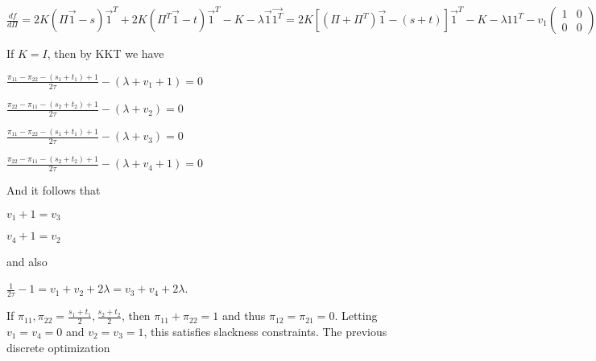 $\frac{df}{d\Pi}=2K(\Pi\vec{1}-s)\vec{1}^{T}+2K(\Pi^{T}\vec{1}-t)\vec{1}^{T}-K-\lambda\vec{1}\vec{1^{T}}=2K[(\Pi+\Pi^{T})\vec{1}-(s+t)]\vec{1}^{T}-K-\lambda11^{T}-v_{1}\left(\begin{array}{cc}
1 & 0\\
0 & 0
\end{array}\right)-v_{2}\left(\begin{array}{cc}
0 & 0\\
1 & 0
\end{array}\right)-v_{3}\left(\begin{array}{cc}
0 & 1\\
0 & 0
\end{array}\right)-v_{4}\left(\begin{array}{cc}
0 & 0\\
0 & 1
\end{array}\right)$

If $K=I$, then by KKT we have 

$\frac{\pi_{11}-\pi_{22}-(s_{1}+t_{1})+1}{2\tau}-(\lambda+v_{1}+1)=0$

$\frac{\pi_{22}-\pi_{11}-(s_{2}+t_{2})+1}{2\tau}-(\lambda+v_{2})=0$

$\frac{\pi_{11}-\pi_{22}-(s_{1}+t_{1})+1}{2\tau}-(\lambda+v_{3})=0$

$\frac{\pi_{22}-\pi_{11}-(s_{2}+t_{2})+1}{2\tau}-(\lambda+v_{4}+1)=0$

And it follows that

$v_{1}+1=v_{3}$

$v_{4}+1=v_{2}$

and also

$\frac{1}{2\tau}-1=v_{1}+v_{2}+2\lambda=v_{3}+v_{4}+2\lambda$.

If $\pi_{11},\pi_{22}=\frac{s_{1}+t_{1}}{2},\frac{s_{2}+t_{2}}{2}$,
then $\pi_{11}+\pi_{22}=1$ and thus $\pi_{12}=\pi_{21}=0$. Letting
$v_{1}=v_{4}=0$ and $v_{2}=v_{3}=1$, this satisfies slackness constraints.
The previous discrete optimization 